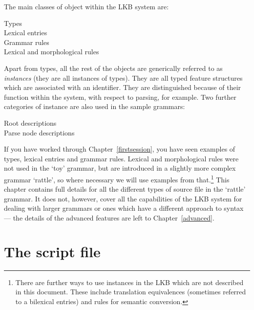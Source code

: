 \documentclass[12pt]{report}
\begin{document}
The main classes of object within the LKB system 
are:
\begin{description}
\item[Types]
\item[Lexical entries]
\item[Grammar rules]
\item[Lexical and morphological rules]
\end{description}
Apart from types, all the rest of the objects are generically referred to
as {\it instances} (they are all instances of types).  
They are all typed feature structures which are associated with an identifier.
They are distinguished because of their function within the system, with respect to
parsing, for example.
Two further categories of instance are also used in the sample
grammars:
\begin{description}
\item[Root descriptions]
\item[Parse node descriptions]
\end{description}

If you have worked through Chapter~\ref{firstsession}, you have seen
examples of types, lexical entries and grammar rules.
Lexical and morphological rules were not used in the `toy' grammar,
but are introduced in a slightly more complex grammar
`rattle', so where necessary we will use examples from 
that.\footnote{There are further ways to use instances in the LKB which are
not described in this document.  These include 
translation equivalences (sometimes referred to
a bilexical entries) and rules for semantic conversion.}
This chapter contains full details for all the different
types of source file in the `rattle' grammar.
It does not, however, cover all the capabilities of the LKB system
for dealing with larger grammars or ones which have a different
approach to syntax --- the details of the advanced features
are left to Chapter~\ref{advanced}.

\section{The script file}
\label{script-intro}
\end{document}
